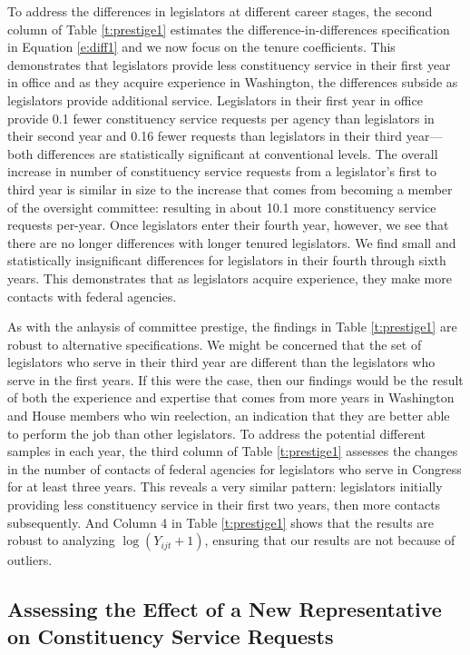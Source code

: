 \documentclass{article}
\begin{document}
To address the differences in legislators at different career stages, the second column of Table \ref{t:prestige1} estimates the difference-in-differences specification in Equation \ref{e:diff1} and we now focus on the tenure coefficients.  This demonstrates that legislators provide less constituency service in their first year in office and as they acquire experience in Washington, the differences subside as legislators provide additional service.  Legislators in their first year in office provide 0.1 fewer constituency service requests per agency than legislators in their second year and 0.16 fewer requests than legislators in their third year---both differences are statistically significant at conventional levels.  The overall increase in number of constituency service requests from a legislator's first to third year is similar in size to the increase that comes from becoming a member of the oversight committee: resulting in about 10.1 more constituency service requests per-year.  Once legislators enter their fourth year, however, we see that there are no longer differences with longer tenured legislators.  We find small and statistically insignificant differences for legislators in their fourth through sixth years.  This demonstrates that as legislators acquire experience, they make more contacts with federal agencies.  

As with the anlaysis of committee prestige, the findings in Table \ref{t:prestige1} are robust to alternative specifications.  We might be concerned that the set of legislators who serve in their third year are different than the legislators who serve in the first years.  If this were the case, then our findings would be the result of both the experience and expertise that comes from more years in Washington and House members who win reelection, an indication that they are better able to perform the job than other legislators.  To address the potential different samples in each year, the third column of Table \ref{t:prestige1} assesses the changes in the number of contacts of federal agencies for legislators who serve in Congress for at least three years.  This reveals a very similar pattern: legislators initially providing less constituency service in their first two years, then more contacts subsequently.  And Column 4 in Table \ref{t:prestige1} shows that the results are robust to analyzing $\log(Y_{ijt} + 1)$, ensuring that our results are not because of outliers.  

\subsection{Assessing the Effect of a New Representative on Constituency Service Requests}
\end{document}
